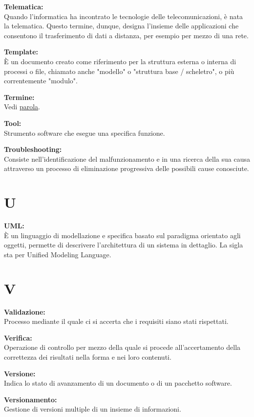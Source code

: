 \documentclass[a4paper, oneside, openany, dvipsnames, table]{article}
\begin{document}
\textbf{Telematica:}\\ Quando l'informatica ha incontrato le tecnologie delle telecomunicazioni, è nata la telematica. Questo termine, dunque, designa l'insieme delle applicazioni che consentono il trasferimento di dati a distanza, per esempio per mezzo di una rete. 

\textbf{Template:}\\ \`E un documento creato come riferimento per la struttura esterna o interna di processi o file, chiamato anche "modello" o "struttura base / scheletro", o più correntemente "modulo".

\textbf{Termine:}\\
Vedi \hyperref[par:parola]{parola}.

\textbf{Tool:}\\	Strumento software che esegue una specifica funzione.

\textbf{Troubleshooting:}\\	Consiste nell'identificazione del malfunzionamento e in una ricerca della sua causa attraverso un processo di eliminazione progressiva delle possibili cause conosciute.

\newpage 
\section{U}

\textbf{UML:}\\ \`E un linguaggio di modellazione e specifica basato sul paradigma orientato agli oggetti, permette di descrivere l'architettura di un sistema in dettaglio. La sigla sta per Unified Modeling Language.

\newpage
\section{V}
\textbf{Validazione:}\\	Processo mediante il quale ci si accerta che i requisiti siano stati rispettati.

\textbf{Verifica:}\\	Operazione di controllo per mezzo della quale si procede all'accertamento della correttezza dei risultati nella forma e nei loro contenuti.

\textbf{Versione:}\\ Indica lo stato di avanzamento di un documento o di un pacchetto software.

\textbf{Versionamento:}\\	Gestione di versioni multiple di un insieme di informazioni.
\end{document}
